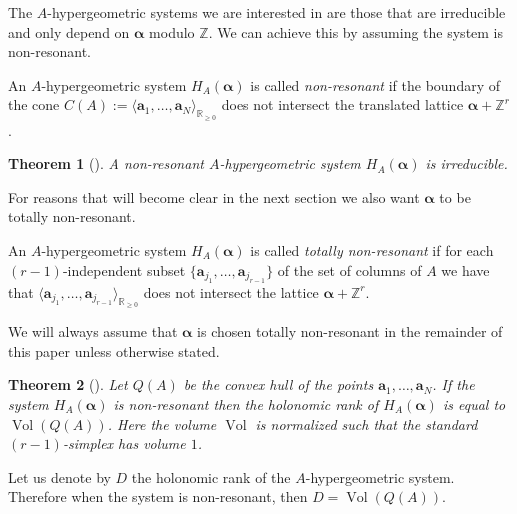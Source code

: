 \documentclass[pdftex]{sigma}
\DeclareMathOperator*{\Vol}{Vol}
\numberwithin{equation}{section}
\newtheorem{Theorem}{Theorem}[section]
\begin{document}
The $A$-hypergeometric systems we are interested in are those that are irreducible and only depend on $\bm{\alpha}$ modulo $\mathbb{Z}$. We can achieve this by assuming the system is non-resonant.

\begin{Definition}
An $A$-hypergeometric system $H_{A}(\bm{\alpha})$ is called {\it non-resonant} if the boundary of the cone $C(A) := \langle \bm{a}_1, \dots,\bm{a}_N \rangle_{\mathbb{R}_{\geq 0}}$ does not intersect the translated lattice $\bm{\alpha} + \mathbb{Z}^r$.
\end{Definition}

\begin{Theorem}[{\cite[Theorem 2.11]{GKZ90}}]
A non-resonant {$A$-hypergeometric} system $H_A(\bm\alpha)$ is irreducible.
\end{Theorem}

For reasons that will become clear in the next section we also want $\bm{\alpha}$ to be totally non-resonant.

\begin{Definition}\label{def:total-nonres}\sloppy
An $A$-hypergeometric system $H_{A}(\bm{\alpha})$ is called {\it totally non-resonant} if for each \mbox{$(r-1)$}-independent subset $\{\bm{a}_{j_1},\dots,\bm{a}_{j_{r-1}}\}$ of the set of columns of $A$ we have that $\langle \bm{a}_{j_1}, \dots,\bm{a}_{j_{r-1}} \rangle_{\mathbb{R}_{\geq 0}}$ does not intersect the lattice $\bm{\alpha} + \mathbb{Z}^r$.
\end{Definition}

We will always assume that $\bm{\alpha}$ is chosen totally non-resonant in the remainder of this paper unless otherwise stated.

\begin{Theorem}[{\cite[Corollary 5.20]{Ado94}}]\label{thm:A-rank}
Let $Q(A)$ be the convex hull of the points $\bm{a}_1,\dots,\bm{a}_N$. If the system $H_{A}(\bm{\alpha})$ is non-resonant then the holonomic rank of $H_{A}(\bm{\alpha})$ is equal to $\Vol(Q(A))$. Here the volume $\Vol$ is normalized such that the standard $(r-1)$-simplex has volume $1$.
\end{Theorem}
Let us denote by $D$ the holonomic rank of the $A$-hypergeometric system. Therefore when the system is non-resonant, then $D = \Vol(Q(A))$.
\end{document}
